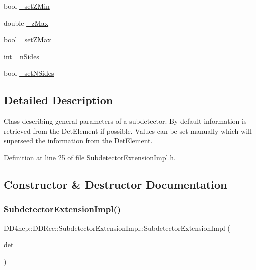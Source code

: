 \begin{DoxyCompactItemize}
bool \hyperlink{class_d_d4hep_1_1_d_d_rec_1_1_subdetector_extension_impl_a7f2f6db8f2c5f98b732bcea3a452a12f}{\+\_\+set\+Z\+Min}
\item 
double \hyperlink{class_d_d4hep_1_1_d_d_rec_1_1_subdetector_extension_impl_aa8e755cc627d81013fb4e3501fdbe172}{\+\_\+z\+Max}
\item 
bool \hyperlink{class_d_d4hep_1_1_d_d_rec_1_1_subdetector_extension_impl_a6e86e2a12196aff1d36c2b79146c9a1b}{\+\_\+set\+Z\+Max}
\item 
int \hyperlink{class_d_d4hep_1_1_d_d_rec_1_1_subdetector_extension_impl_a5f3f5b1a0cc55c564536556accc0579a}{\+\_\+n\+Sides}
\item 
bool \hyperlink{class_d_d4hep_1_1_d_d_rec_1_1_subdetector_extension_impl_a1a8b0613327d2cac9e1783fcf7f22be9}{\+\_\+set\+N\+Sides}
\end{DoxyCompactItemize}


\subsection{Detailed Description}
Class describing general parameters of a subdetector. By default information is retrieved from the Det\+Element if possible. Values can be set manually which will superseed the information from the Det\+Element. 

Definition at line 25 of file Subdetector\+Extension\+Impl.\+h.



\subsection{Constructor \& Destructor Documentation}
\hypertarget{class_d_d4hep_1_1_d_d_rec_1_1_subdetector_extension_impl_aa87c1c247120d64f47319b314c1e9981}{}\label{class_d_d4hep_1_1_d_d_rec_1_1_subdetector_extension_impl_aa87c1c247120d64f47319b314c1e9981} 
\subsubsection{\texorpdfstring{Subdetector\+Extension\+Impl()}{SubdetectorExtensionImpl()}\hspace{0.1cm}{\footnotesize\ttfamily [1/2]}}
{\footnotesize\ttfamily D\+D4hep\+::\+D\+D\+Rec\+::\+Subdetector\+Extension\+Impl\+::\+Subdetector\+Extension\+Impl (\begin{DoxyParamCaption}\item[{const \hyperlink{class_d_d4hep_1_1_geometry_1_1_det_element}{Geometry\+::\+Det\+Element} \&}]{det }\end{DoxyParamCaption})}



